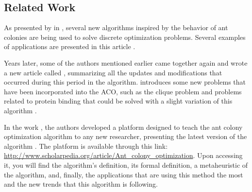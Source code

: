 \subsection{Related Work}

As presented by \citeauthor{ACO_New_Algorithm} in , several
new algorithms inspired by the behavior of ant colonies are being used
to solve discrete optimization problems. Several
examples of applications are presented in this article \cite{ACO_New_Algorithm}.

Years later, some of the authors mentioned earlier came together again and
wrote a new article called , summarizing all the updates
and modifications that occurred during this period in the algorithm. \citeauthor{UpdatesInACO} introduces
some new problems that have been incorporated into the ACO, such as the clique problem and problems
related to protein binding that could be solved with a slight variation of this algorithm
\cite{UpdatesInACO}.

In the work , the authors \citeauthor{ACO_New_Algorithm_20anos}
developed a platform designed to teach the ant colony optimization algorithm
to any new researcher, presenting the latest version of the algorithm \cite{ACO_New_Algorithm_20anos}.
The platform is available through this link: \url{http://www.scholarpedia.org/article/Ant_colony_optimization}.
Upon accessing it, you will find the algorithm's definition, its formal definition, a metaheuristic
of the algorithm, and, finally, the applications that are using this method the most and the new trends
that this algorithm is following.
